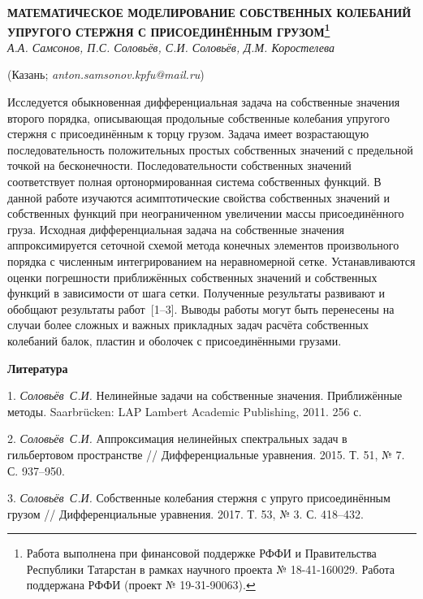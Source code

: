 
\begin{center}
    {\bf МАТЕМАТИЧЕСКОЕ МОДЕЛИРОВАНИЕ СОБСТВЕННЫХ КОЛЕБАНИЙ УПРУГОГО СТЕРЖНЯ С ПРИСОЕДИНЁННЫМ ГРУЗОМ\footnote{Работа выполнена при финансовой поддержке РФФИ и Правительства Республики Татарстан в рамках научного проекта  № 18-41-160029.
Работа поддержана РФФИ (проект № 19-31-90063).}}\\

    {\it А.А. Самсонов, П.С. Соловьёв, С.И. Соловьёв, Д.М. Коростелева}

    (Казань; {\it anton.samsonov.kpfu@mail.ru})
\end{center}



Исследуется обыкновенная дифференциальная задача на собственные значения второго порядка,
описывающая продольные собственные колебания упругого стержня с присоединённым к торцу грузом.
Задача имеет возрастающую последовательность положительных простых собственных значений
с предельной точкой на бесконечности.
Последовательности собственных значений соответствует полная ортонормированная система
собственных функций.
В данной работе изучаются асимптотические свойства собственных значений и собственных функций
при неограниченном увеличении
массы присоединённого груза.
Исходная дифференциальная задача на собственные значения аппроксимируется
сеточной схемой метода конечных элементов произвольного порядка с численным интегрированием на неравномерной сетке.
Устанавливаются оценки погрешности приближённых собственных значений
и собственных функций в зависимости от шага сетки.
Полученные результаты развивают и обобщают результаты работ~[1--3].
Выводы работы могут быть перенесены на случаи
более сложных и важных прикладных задач расчёта собственных колебаний балок, пластин и оболочек
с присоединёнными грузами.



\smallskip \centerline {\bf Литература} \nopagebreak

1. {\it Соловьёв~С.И.}
Нелинейные задачи на собственные значения. Приближённые методы.
Saarbr\"ucken: LAP Lambert Academic Publishing, 2011. 256 с.

2. {\it Соловьёв~С.И.}
Аппроксимация нелинейных спектральных задач в гильбертовом пространстве
// Дифференциальные уравнения. 2015. Т. 51,
№ 7. С. 937--950.

3. {\it Соловьёв~С.И.}
Собственные колебания стержня с упруго присоединённым грузом
// Дифференциальные уравнения. 2017. Т. 53,
№ 3. С. 418--432.






